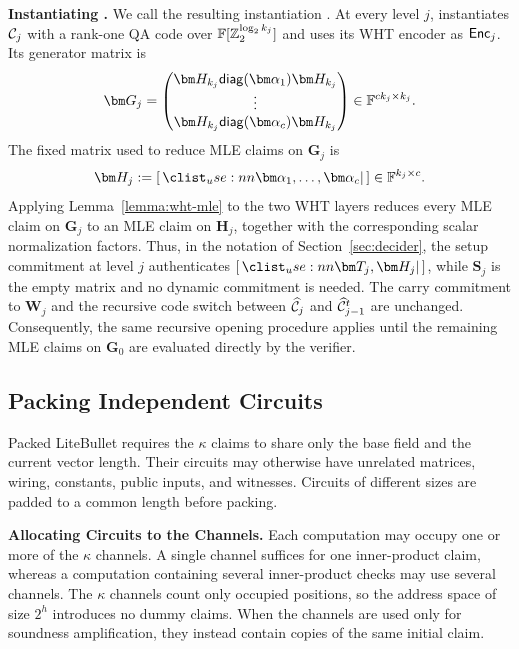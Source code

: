 \documentclass[runningheads]{llncs}
\begin{document}
\medskip
\noindent
\textbf{Instantiating \methodname.}
We call the resulting instantiation \qafold.
At every level \(j\), \qafold instantiates \({\mathcal{C}}_j\) with a rank-one QA code
over \({\mathbb{F}}[\mathbb Z_2^{\log_2 k_j}]\) and uses its WHT encoder as
\({\sf Enc}_j\).  Its generator matrix is
\[
    \bm G_j
    =
    \begin{pmatrix}
        \bm H_{k_j}\diag(\bm\alpha_1)\bm H_{k_j}\\
        \vdots\\
        \bm H_{k_j}\diag(\bm\alpha_c)\bm H_{k_j}
    \end{pmatrix}
    \in
    \Field^{ck_j\times k_j}.
\]
The fixed matrix used to reduce MLE claims on \(\bm G_j\) is
\[
    \bm H_j
    :=
    \concat{\bm\alpha_1,\ldots,\bm\alpha_c}
    \in
    \Field^{k_j\times c}.
\]
Applying Lemma~\ref{lemma:wht-mle} to the two WHT layers reduces every
MLE claim on \(\bm G_j\) to an MLE claim on \(\bm H_j\), together with
the corresponding scalar normalization factors.  Thus, in the notation
of Section~\ref{sec:decider}, the setup commitment at level \(j\)
authenticates \(\concat{\bm T_j,\bm H_j}\), while \(\bm S_j\) is the empty
matrix and no dynamic commitment is needed.  The carry commitment to
\(\bm W_j\) and the recursive code switch between
\(\widehat{{\mathcal{C}}}_j\) and \(\widehat{{\mathcal{C}}}_{j-1}^{t}\) are unchanged.
Consequently, the same recursive opening procedure applies until the
remaining MLE claims on \(\bm G_0\) are evaluated directly by the verifier.


\subsection{Packing Independent Circuits}
\label{sec:independent-circuits}
Packed LiteBullet requires the \(\kappa\) claims to share only the base
field and the current vector length.  Their circuits may otherwise have
unrelated matrices, wiring, constants, public inputs, and witnesses.
Circuits of different sizes are padded to a common length before
packing.

\medskip \noindent
{\bf Allocating Circuits to the Channels.}
Each computation may occupy one or more of the \(\kappa\) channels.
A single channel suffices for one inner-product claim, whereas a
computation containing several inner-product checks may use several
channels.  The \(\kappa\) channels count only occupied positions, so
the address space of size \(2^h\) introduces no dummy claims.  When
the channels are used only for soundness amplification, they instead
contain copies of the same initial claim.
\end{document}
